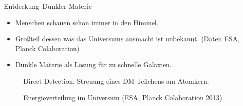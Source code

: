 \begin{frame}{\glqq Entdeckung\grqq\ Dunkler Materie}
	\begin{itemize}
		\item Menschen schauen schon immer in den Himmel.
		\item Großteil dessen was das Universums ausmacht ist unbekannt. (Daten ESA, Planck Colaboration)
		\item Dunkle Materie als Lösung für zu schnelle Galaxien.
	\end{itemize}
	\begin{figure}[H]
		\resizebox{.5\textwidth}{!}{
			
		}
		\caption{Direct Detection: Streuung eines DM-Teilchens am Atomkern.}
	\end{figure}
\end{frame}
\begin{frame}
	\begin{figure}
		\centering
		\caption{Energieverteilung im Universum (ESA, Planck Colaboration 2013)}
	\end{figure}
\end{frame}